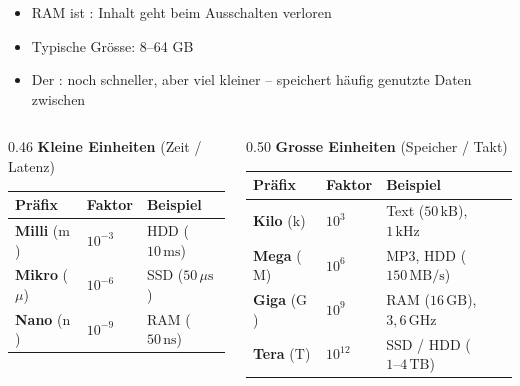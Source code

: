 \begin{frame}
\begin{itemize}[<+->]\setlength\itemsep{7pt}
  \item RAM ist : Inhalt geht beim Ausschalten verloren
  \item Typische Grösse: 8--64 GB
  \item Der : noch schneller, aber viel kleiner -- speichert häufig genutzte Daten zwischen
\end{itemize}
\end{frame}

\begin{frame}
\begin{columns}[T,onlytextwidth]
\begin{column}{0.46\textwidth}
{\color{FDUteal}\textbf{Kleine Einheiten}} \scriptsize(Zeit / Latenz)\par\vspace{2mm}
\scriptsize
\setlength{\tabcolsep}{2.5pt}
\begin{tabular}{@{}lll@{}}
    \textbf{Präfix} & \textbf{Faktor} & \textbf{Beispiel} \\\midrule
    \textbf{Milli} ($\mathrm{m}$) & $10^{-3}$ & HDD ($10\,\mathrm{ms}$) \\
    \textbf{Mikro} ($\mu$) & $10^{-6}$ & SSD ($50\,\mu\mathrm{s}$) \\
    \textbf{Nano} ($\mathrm{n}$) & $10^{-9}$ & RAM ($50\,\mathrm{ns}$) \\
\end{tabular}
\end{column}
\hfill
\begin{column}{0.50\textwidth}
{\color{FDUblue}\textbf{Grosse Einheiten}} \scriptsize(Speicher / Takt)\par\vspace{2mm}
\scriptsize
\setlength{\tabcolsep}{2.5pt}
\begin{tabular}{@{}lll@{}}
    \textbf{Präfix} & \textbf{Faktor} & \textbf{Beispiel} \\\midrule
    \textbf{Kilo} ($\mathrm{k}$) & $10^3$ & Text ($50\,\mathrm{kB}$), $1\,\mathrm{kHz}$ \\
    \textbf{Mega} ($\mathrm{M}$) & $10^6$ & MP3, HDD ($150\,\mathrm{MB/s}$) \\
    \textbf{Giga} ($\mathrm{G}$) & $10^9$ & RAM ($16\,\mathrm{GB}$), $3{,}6\,\mathrm{GHz}$ \\
    \textbf{Tera} ($\mathrm{T}$) & $10^{12}$ & SSD / HDD ($1\text{--}4\,\mathrm{TB}$) \\
\end{tabular}
\end{column}
\end{columns}
\end{frame}


